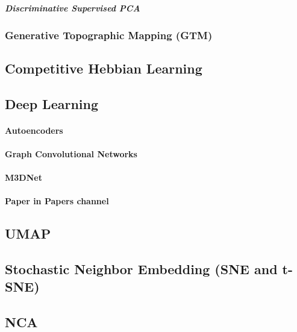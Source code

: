 \subparagraph{Discriminative Supervised PCA} 


\subsubsection{Generative Topographic Mapping (GTM)}

\subsection{Competitive Hebbian Learning}

\subsection{Deep Learning}

\paragraph{Autoencoders}


\paragraph{Graph Convolutional Networks}

\paragraph{M3DNet}

\paragraph{Paper in Papers channel}

\subsection{UMAP}

\subsection{Stochastic Neighbor Embedding (SNE and t-SNE)}

\subsection{NCA}

